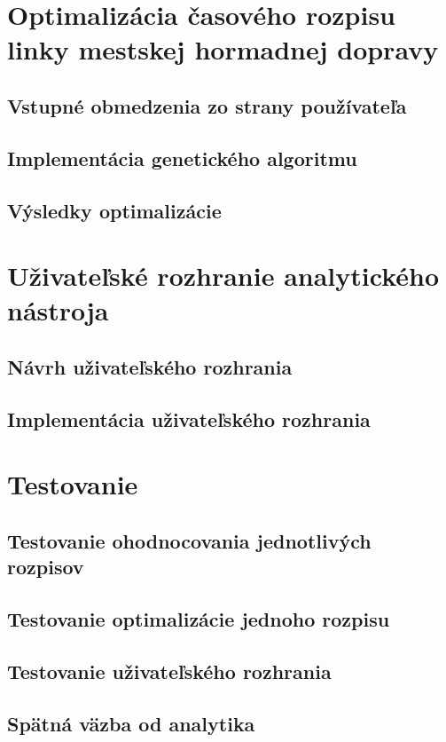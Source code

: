 \chapter{Optimalizácia časového rozpisu linky mestskej hormadnej dopravy} %
\label{optimalizacia}
\section{Vstupné obmedzenia zo strany používateľa}
\section{Implementácia genetického algoritmu}
\section{Výsledky optimalizácie}

\chapter{Uživateľské rozhranie analytického nástroja} %
\label{uzivatelske_rozhranie}
\section{Návrh uživateľského rozhrania}
\section{Implementácia uživateľského rozhrania}

\chapter{Testovanie} %
\label{testovanie}
\section{Testovanie ohodnocovania jednotlivých rozpisov}
\section{Testovanie optimalizácie jednoho rozpisu}
\section{Testovanie uživateľského rozhrania}
\section{Spätná väzba od analytika}

